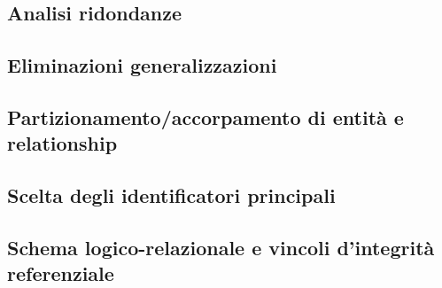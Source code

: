 \subsection{Analisi ridondanze}
	
	
\subsection{Eliminazioni generalizzazioni}


\subsection{Partizionamento/accorpamento di entità e relationship}


\subsection{Scelta degli identificatori principali}


\subsection{Schema logico-relazionale e vincoli d'integrità referenziale}

